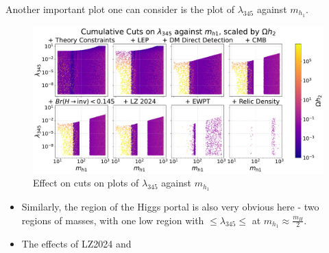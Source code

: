 \documentclass[12pt]{article}
\newcommand{\mhone}{m_{h_1}}
\begin{document}
Another important plot one can consider is the plot of $\lambda_{345}$ against $\mhone$.  
\begin{figure}[H]
    \centering
    \includegraphics[width=\linewidth]{big_plots_(low_dpi)/l345_against_MD1_Omegah2.pdf}
    \caption{Effect on cuts on plots of $\lambda_{345}$ against $\mhone$}
    \label{fig:l345_md1}
\end{figure}
\begin{itemize}
    \item Similarly, the region of the Higgs portal is also very obvious here - two regions of masses, with one low region with $ \leq \lambda_{345} \leq $ at $\mhone \approx \frac{m_H}{2}$. 
    \item The effects of LZ2024 and 
\end{itemize}
\end{document}
